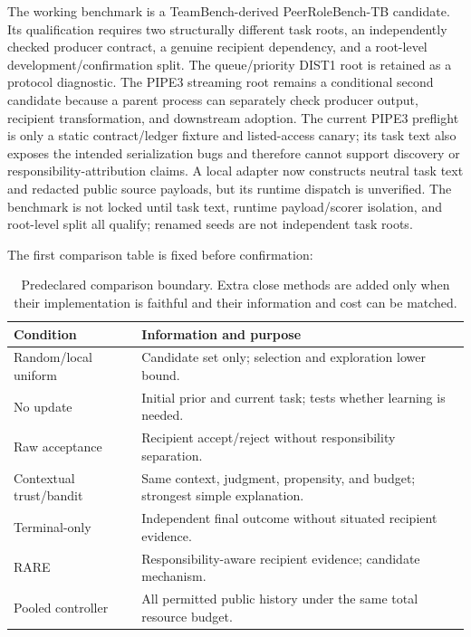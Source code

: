 \documentclass[sigconf,anonymous]{aamas}
\begin{document}
The working benchmark is a TeamBench-derived PeerRoleBench-TB candidate. Its qualification
requires two structurally different task roots, an independently checked producer
contract, a genuine recipient dependency, and a root-level development/confirmation split.
The queue/priority DIST1 root is retained as a protocol diagnostic. The PIPE3 streaming
root remains a conditional second candidate because a parent process can separately check
producer output, recipient transformation, and downstream adoption. The current PIPE3
preflight is only a static contract/ledger fixture and listed-access canary; its task text
also exposes the intended serialization bugs and therefore cannot support discovery or
responsibility-attribution claims. A local adapter now constructs neutral task text and
redacted public source payloads, but its runtime dispatch is unverified. The benchmark is not locked until task text, runtime
payload/scorer isolation, and root-level split all qualify; renamed seeds are not independent
task roots.

The first comparison table is fixed before confirmation:
\begin{table}[t]
\centering
\small
\begin{tabular}{p{}p{}}
\toprule
Condition & Information and purpose\\
\midrule
Random/local uniform & Candidate set only; selection and exploration lower bound.\\
No update & Initial prior and current task; tests whether learning is needed.\\
Raw acceptance & Recipient accept/reject without responsibility separation.\\
Contextual trust/bandit & Same context, judgment, propensity, and budget; strongest simple explanation.\\
Terminal-only & Independent final outcome without situated recipient evidence.\\
RARE & Responsibility-aware recipient evidence; candidate mechanism.\\
Pooled controller & All permitted public history under the same total resource budget.\\
\bottomrule
\end{tabular}
\caption{Predeclared comparison boundary. Extra close methods are added only when their
implementation is faithful and their information and cost can be matched.}
\label{tab:baselines}
\end{table}
\end{document}
